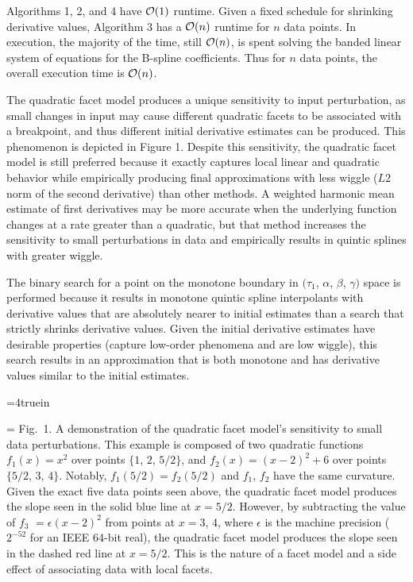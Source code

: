 Algorithms 1, 2, and 4 have ${\cal O}(1)$ runtime. Given a fixed
schedule for shrinking derivative values, Algorithm 3 has a ${\cal
  O}(n)$ runtime for $n$ data points. In execution, the majority of
the time, still ${\cal O}(n)$, is spent solving the banded linear
system of equations for the B-spline coefficients. Thus for $n$ data
points, the overall execution time is ${\cal O}(n)$.

The quadratic facet model produces a unique sensitivity to input
perturbation, as small changes in input may cause different quadratic
facets to be associated with a breakpoint, and thus different initial
derivative estimates can be produced. This phenomenon is depicted in
Figure 1. Despite this sensitivity, the quadratic facet model is still
preferred because it exactly captures local linear and quadratic
behavior while empirically producing final approximations with less
wiggle ($L2$ norm of the second derivative) than other methods. A
weighted harmonic mean estimate of first derivatives may be more
accurate when the underlying function changes at a rate greater than a
quadratic, but that method increases the sensitivity to small
perturbations in data and empirically results in quintic splines with
greater wiggle.

The binary search for a point on the monotone boundary in $(\tau_1$,
$\alpha$, $\beta$, $\gamma)$ space is performed because it results in
monotone quintic spline interpolants with derivative values that are
absolutely nearer to initial estimates than a search that strictly
shrinks derivative values. Given the initial derivative estimates have
desirable properties (capture low-order phenomena and are low wiggle),
this search results in an approximation that is both monotone and has
derivative values similar to the initial estimates.


\topinsert
\centerline{\epsfxsize=4truein }
{\everymath={\scriptstyle}
\narrower\noindent\rmVIII Fig.\ 1. A demonstration of the quadratic
  facet model's sensitivity to small data perturbations. This example is
  composed of two quadratic functions $f_1(x) = x^2$ over points $\{1$,
  $2$, $5/2\}$, and $f_2(x) = (x-2)^2 + 6$ over points $\{5/2$, $3$,
  $4\}$. Notably, $f_1(5/2) = f_2(5/2)$ and $f_1$, $f_2$ have the same
  curvature. Given the exact five data points seen above, the quadratic
  facet model produces the slope seen in the solid blue line at $x = 5/2$.
  However, by subtracting the value of $f_3$ $= \epsilon(x-2)^2$ from
  points at $x = 3$, 4, where $\epsilon$ is the machine precision
  ($2^{-52}$ for an IEEE 64-bit real), the quadratic facet model produces
  the slope seen in the dashed red line at $x = 5/2$. This is the nature
  of a facet model and a side effect of associating data with local facets.
\par} \endinsert
